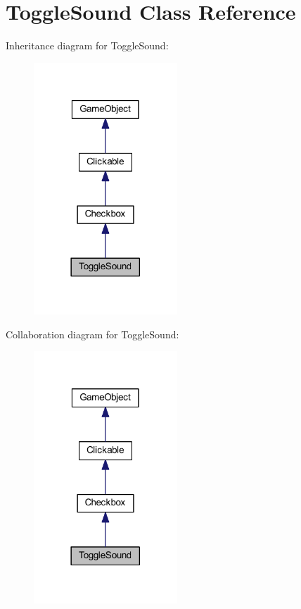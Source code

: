 \hypertarget{class_toggle_sound}{\section{Toggle\+Sound Class Reference}
\label{class_toggle_sound}
}


Inheritance diagram for Toggle\+Sound\+:\nopagebreak
\begin{figure}[H]
\begin{center}
\leavevmode
\includegraphics[width=153pt]{class_toggle_sound__inherit__graph}
\end{center}
\end{figure}


Collaboration diagram for Toggle\+Sound\+:\nopagebreak
\begin{figure}[H]
\begin{center}
\leavevmode
\includegraphics[width=153pt]{class_toggle_sound__coll__graph}
\end{center}
\end{figure}
